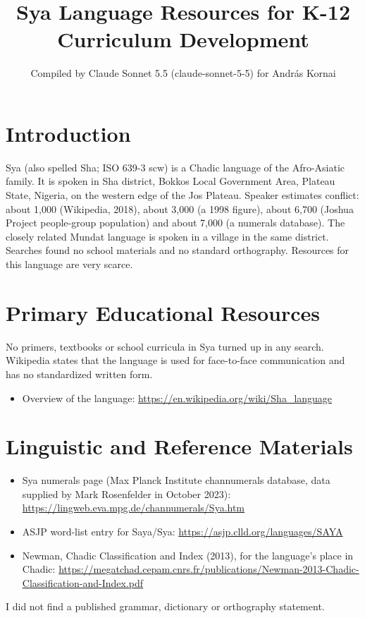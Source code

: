\documentclass[12pt]{article}
\title{Sya Language Resources for K-12 Curriculum Development}
\author{Compiled by Claude Sonnet 5.5 (claude-sonnet-5-5) for Andr\'as Kornai}
\date{}
\begin{document}
\maketitle

\section{Introduction}
Sya (also spelled Sha; ISO 639-3 scw) is a Chadic language of the Afro-Asiatic family. It is spoken in Sha district, Bokkos Local Government Area, Plateau State, Nigeria, on the western edge of the Jos Plateau. Speaker estimates conflict: about 1,000 (Wikipedia, 2018), about 3,000 (a 1998 figure), about 6,700 (Joshua Project people-group population) and about 7,000 (a numerals database). The closely related Mundat language is spoken in a village in the same district. Searches found no school materials and no standard orthography. Resources for this language are very scarce.

\section{Primary Educational Resources}
No primers, textbooks or school curricula in Sya turned up in any search. Wikipedia states that the language is used for face-to-face communication and has no standardized written form.
\begin{itemize}
\item Overview of the language: \url{https://en.wikipedia.org/wiki/Sha_language}
\end{itemize}

\section{Linguistic and Reference Materials}
\begin{itemize}
\item Sya numerals page (Max Planck Institute channumerals database, data supplied by Mark Rosenfelder in October 2023): \url{https://lingweb.eva.mpg.de/channumerals/Sya.htm}
\item ASJP word-list entry for Saya/Sya: \url{https://asjp.clld.org/languages/SAYA}
\item Newman, Chadic Classification and Index (2013), for the language's place in Chadic: \url{https://megatchad.cepam.cnrs.fr/publications/Newman-2013-Chadic-Classification-and-Index.pdf}
\end{itemize}
I did not find a published grammar, dictionary or orthography statement.
\end{document}
